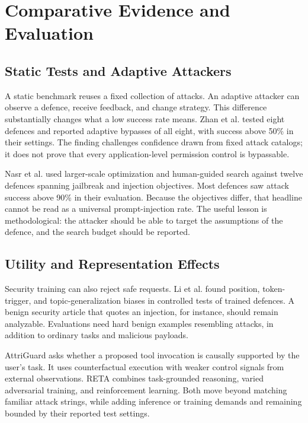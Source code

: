 \documentclass[conference]{IEEEtran}
\begin{document}
\section{Comparative Evidence and Evaluation}
\subsection{Static Tests and Adaptive Attackers}
A static benchmark reuses a fixed collection of attacks. An adaptive attacker can observe a defence, receive feedback, and change strategy. This difference substantially changes what a low success rate means. Zhan et al. \cite{zhan2025adaptive} tested eight defences and reported adaptive bypasses of all eight, with success above 50\% in their settings. The finding challenges confidence drawn from fixed attack catalogs; it does not prove that every application-level permission control is bypassable.

Nasr et al. \cite{nasr2026attacker} used larger-scale optimization and human-guided search against twelve defences spanning jailbreak and injection objectives. Most defences saw attack success above 90\% in their evaluation. Because the objectives differ, that headline cannot be read as a universal prompt-injection rate. The useful lesson is methodological: the attacker should be able to target the assumptions of the defence, and the search budget should be reported.

\subsection{Utility and Representation Effects}
Security training can also reject safe requests. Li et al. \cite{li2026heuristics} found position, token-trigger, and topic-generalization biases in controlled tests of trained defences. A benign security article that quotes an injection, for instance, should remain analyzable. Evaluations need hard benign examples resembling attacks, in addition to ordinary tasks and malicious payloads.

AttriGuard \cite{he2026attriguard} asks whether a proposed tool invocation is causally supported by the user's task. It uses counterfactual execution with weaker control signals from external observations. RETA \cite{he2026reta} combines task-grounded reasoning, varied adversarial training, and reinforcement learning. Both move beyond matching familiar attack strings, while adding inference or training demands and remaining bounded by their reported test settings.
\end{document}
